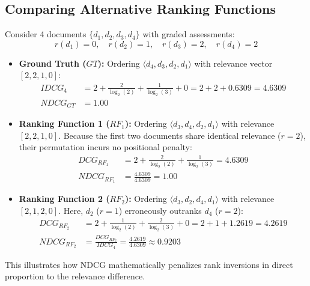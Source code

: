 \subsection{Comparing Alternative Ranking Functions}
Consider 4 documents $\{d_1, d_2, d_3, d_4\}$ with graded assessments:
\[
r(d_1) = 0, \quad r(d_2) = 1, \quad r(d_3) = 2, \quad r(d_4) = 2
\]
\begin{itemize}
    \item \textbf{Ground Truth ($GT$):} Ordering $\langle d_4, d_3, d_2, d_1 \rangle$ with relevance vector $[2, 2, 1, 0]$:
    \begin{align*}
    IDCG_4 &= 2 + \frac{2}{\log_2(2)} + \frac{1}{\log_2(3)} + 0 = 2 + 2 + 0.6309 = 4.6309 \\
    NDCG_{GT} &= 1.00
    \end{align*}
    \item \textbf{Ranking Function 1 ($RF_1$):} Ordering $\langle d_3, d_4, d_2, d_1 \rangle$ with relevance $[2, 2, 1, 0]$.
    Because the first two documents share identical relevance ($r=2$), their permutation incurs no positional penalty:
    \begin{align*}
    DCG_{RF_1} &= 2 + \frac{2}{\log_2(2)} + \frac{1}{\log_2(3)} = 4.6309 \\
    NDCG_{RF_1} &= \frac{4.6309}{4.6309} = 1.00
    \end{align*}
    \item \textbf{Ranking Function 2 ($RF_2$):} Ordering $\langle d_3, d_2, d_4, d_1 \rangle$ with relevance $[2, 1, 2, 0]$.
    Here, $d_2$ ($r=1$) erroneously outranks $d_4$ ($r=2$):
    \begin{align*}
    DCG_{RF_2} &= 2 + \frac{1}{\log_2(2)} + \frac{2}{\log_2(3)} + 0 = 2 + 1 + 1.2619 = 4.2619 \\
    NDCG_{RF_2} &= \frac{DCG_{RF_2}}{IDCG_4} = \frac{4.2619}{4.6309} \approx 0.9203
    \end{align*}
\end{itemize}
This illustrates how NDCG mathematically penalizes rank inversions in direct proportion to the relevance difference.
